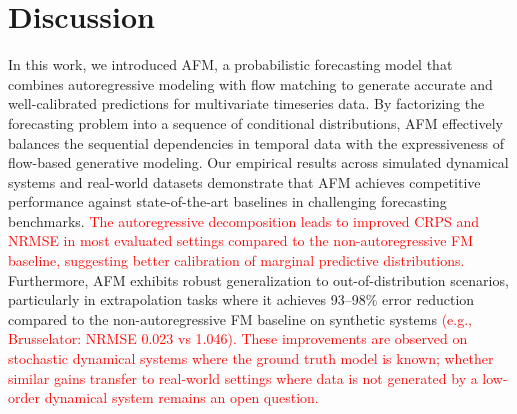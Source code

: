 \documentclass[a4paper,10pt,twocolumn,preprint,3p]{elsarticle}
\begin{document}
\section{Discussion}
In this work, we introduced AFM, a probabilistic forecasting model that combines autoregressive modeling with flow matching to generate accurate and well-calibrated predictions for multivariate timeseries data. By factorizing the forecasting problem into a sequence of conditional distributions, AFM effectively balances the sequential dependencies in temporal data with the expressiveness of flow-based generative modeling.
Our empirical results across simulated dynamical systems and real-world datasets demonstrate that AFM achieves competitive performance against state-of-the-art baselines in challenging forecasting benchmarks. \textcolor{red}{The autoregressive decomposition leads to improved CRPS and NRMSE in most evaluated settings compared to the non-autoregressive FM baseline, suggesting better calibration of marginal predictive distributions.} Furthermore, AFM exhibits robust generalization to out-of-distribution scenarios, particularly in extrapolation tasks where it achieves 93--98\% error reduction compared to the non-autoregressive FM baseline on synthetic systems \textcolor{red}{(e.g., Brusselator: NRMSE 0.023 vs 1.046). These improvements are observed on stochastic dynamical systems where the ground truth model is known; whether similar gains transfer to real-world settings where data is not generated by a low-order dynamical system remains an open question.} %
\end{document}
